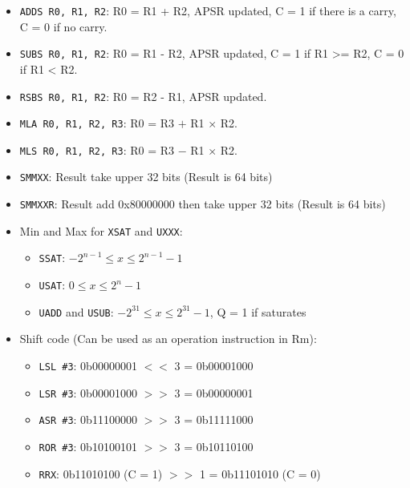 \documentclass[a4paper,12pt,openany]{book}
\begin{document}
\begin{itemize}
    \item \texttt{ADDS R0, R1, R2}: R0 = R1 + R2, APSR updated, C = 1 if there is a carry, C = 0 if no carry.
    \item \texttt{SUBS R0, R1, R2}: R0 = R1 - R2, APSR updated, C = 1 if R1 >= R2, C = 0 if R1 < R2.
    \item \texttt{RSBS R0, R1, R2}: R0 = R2 - R1, APSR updated.
    \item \texttt{MLA R0, R1, R2, R3}: R0 = R3 $+$ R1 $\times$ R2.
    \item \texttt{MLS R0, R1, R2, R3}: R0 = R3 $-$ R1 $\times$ R2.
    \item \texttt{SMMXX}: Result take upper 32 bits (Result is 64 bits)
    \item \texttt{SMMXXR}: Result add 0x80000000 then take upper 32 bits (Result is 64 bits)
    \item Min and Max for \texttt{XSAT} and \texttt{UXXX}:
    \begin{itemize}
        \item \texttt{SSAT}: $-2^{n-1}\leqslant x \leqslant 2^{n-1}-1$
        \item \texttt{USAT}: $0\leqslant x \leqslant 2^n-1$
        \item \texttt{UADD} and \texttt{USUB}: $-2^{31}\leqslant x \leqslant 2^{31}-1$, Q = 1 if saturates
    \end{itemize}
    \item Shift code (Can be used as an operation instruction in Rm):
    \begin{itemize}
        \item \texttt{LSL \#3}: 0b00000001 $<<$ 3 = 0b00001000
        \item \texttt{LSR \#3}: 0b00001000 $>>$ 3 = 0b00000001
        \item \texttt{ASR \#3}: 0b11100000 $>>$ 3 = 0b11111000 
        \item \texttt{ROR \#3}: 0b10100101 $>>$ 3 = 0b10110100
        \item \texttt{RRX}: 0b11010100 (C = 1) $>>$ 1 = 0b11101010 (C = 0) 
    \end{itemize}
\end{itemize}
\end{document}
